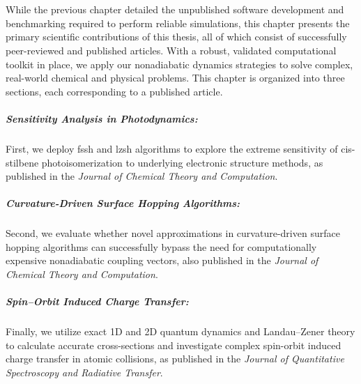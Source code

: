 \chapter{\foldertotitle}\label{chp:primary_scientific_contributions}
While the previous chapter detailed the unpublished software development and benchmarking required to perform reliable simulations, this chapter presents the primary scientific contributions of this thesis, all of which consist of successfully peer-reviewed and published articles. With a robust, validated computational toolkit in place, we apply our nonadiabatic dynamics strategies to solve complex, real-world chemical and physical problems. This chapter is organized into three sections, each corresponding to a published article.
\paragraph{Sensitivity Analysis in Photodynamics:} First, we deploy \acrshort{fssh} and \acrshort{lzsh} algorithms to explore the extreme sensitivity of cis-stilbene photoisomerization to underlying electronic structure methods, as published in the \textit{Journal of Chemical Theory and Computation}.
\paragraph{Curvature-Driven Surface Hopping Algorithms:} Second, we evaluate whether novel approximations in curvature-driven surface hopping algorithms can successfully bypass the need for computationally expensive nonadiabatic coupling vectors, also published in the \textit{Journal of Chemical Theory and Computation}.
\paragraph{Spin--Orbit Induced Charge Transfer:} Finally, we utilize exact 1D and 2D quantum dynamics and Landau--Zener theory to calculate accurate cross-sections and investigate complex spin-orbit induced charge transfer in atomic collisions, as published in the \textit{Journal of Quantitative Spectroscopy and Radiative Transfer}.
